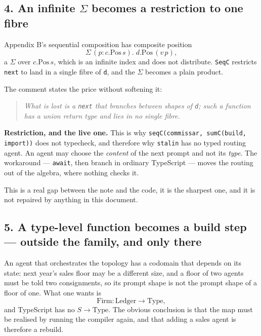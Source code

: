 \documentclass[11pt,a4paper]{article}
\begin{document}
\subsection*{4. An infinite $\Sigma$ becomes a restriction to one fibre}

Appendix B's sequential composition has composite position
\[
  \Sigma\,(p : c.\mathrm{Pos}\,s).\; d.\mathrm{Pos}\,(v\,p),
\]
a $\Sigma$ over $c.\mathrm{Pos}\,s$, which is an infinite index and does not
distribute. \texttt{SeqC} restricts \texttt{next} to land in a single fibre of
\texttt{d}, and the $\Sigma$ becomes a plain product.

The comment states the price without softening it:

\begin{quote}
\emph{What is lost is a \texttt{next} that branches between shapes of
\texttt{d}; such a function has a union return type and lies in no single
fibre.}
\end{quote}

\begin{alarmbox}
\textbf{Restriction, and the live one.} This is why
\texttt{seqC(commissar, sumC(build, import))} does not typecheck, and therefore
why \texttt{stalin} has no typed routing agent. An agent may choose the
\emph{content} of the next prompt and not its \emph{type}. The workaround ---
\texttt{await}, then branch in ordinary TypeScript --- moves the routing out of
the algebra, where nothing checks it.

This is a real gap between the note and the code, it is the sharpest one, and
it is not repaired by anything in this document.
\end{alarmbox}

\subsection*{5. A type-level function becomes a build step --- outside the family, and only there}

An agent that orchestrates the topology has a codomain that depends on its
state: next year's sales floor may be a different size, and a floor of two
agents must be told two consignments, so its prompt shape is not the prompt
shape of a floor of one. What one wants is
\[
  \mathrm{Firm} : \mathrm{Ledger} \to \mathrm{Type},
\]
and TypeScript has no $S \to \mathrm{Type}$. The obvious conclusion is that
the map must be realised by running the compiler again, and that adding a sales
agent is therefore a rebuild.
\end{document}
